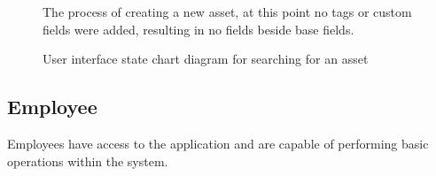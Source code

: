 \begin{figure}[H]
    \centering
    \caption{The process of creating a new asset, at this point no tags or custom fields were added, resulting in no fields beside base fields.}
    \label{fig:add-asset-no-tags}
\end{figure}

\begin{figure}[H]
    \centering
    \caption{User interface state chart diagram for searching for an asset}
    \label{fig:add_asset_with_tags}
\end{figure}


\subsection{Employee}
Employees have access to the application and are capable of performing basic operations within the system.

